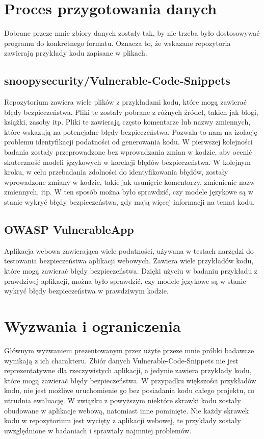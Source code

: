 \section{Proces przygotowania danych}
\label{sec:proces_przygotowania_danych}

Dobrane przeze mnie zbiory danych zostały tak, by nie trzeba było dostosowywać programu do konkretnego formatu. Oznacza to, że wskazane repozytoria zawierają przykłady kodu zapisane w plikach.
\subsection{snoopysecurity/Vulnerable-Code-Snippets} 
Repozytorium zawiera wiele plików z przykładami kodu, które mogą zawierać błędy bezpieczeństwa. Pliki te zostały pobrane z różnych źródeł, takich jak blogi, książki, zasoby itp. Pliki te zawierają często komentarze lub nazwy zmiennych, które wskazują na potencjalne błędy bezpieczeństwa. Pozwala to nam na izolację problemu identyfikacji podatności od generowania kodu. W pierwszej kolejności badania zostały przeprowadzone bez wprowadzania zmian w kodzie, aby ocenić skuteczność modeli językowych w korekcji błędów bezpieczeństwa. W kolejnym kroku, w celu przebadania zdolności do identyfikowania błędów, zostały wprowadzone zmiany w kodzie, takie jak usunięcie komentarzy, zmienienie nazw zmiennych, itp. W ten sposób można było sprawdzić, czy modele językowe są w stanie wykryć błędy bezpieczeństwa, gdy mają więcej informacji na temat kodu.

\subsection{OWASP VulnerableApp}
Aplikacja webowa zawierająca wiele podatności, używana w testach narzędzi do testowania bezpieczeństwa aplikacji webowych. Zawiera wiele przykładów kodu, które mogą zawierać błędy bezpieczeństwa. Dzięki użyciu w badaniu przykładu z prawdziwej aplikacji, można było sprawdzić, czy modele językowe są w stanie wykryć błędy bezpieczeństwa w prawdziwym kodzie.

\section{Wyzwania i ograniczenia}
\label{sec:wyzwania_i_ograniczenia}

Głównym wyzwaniem prezentowanym przez użyte przeze mnie próbki badawcze wynikają z ich charakteru. Zbiór danych Vulnerable-Code-Snippets nie jest reprezentatywne dla rzeczywistych aplikacji, a jedynie zawiera przykłady kodu, które mogą zawierać błędy bezpieczeństwa. W przypadku większości przykładów kodu, nie jest możliwe uruchomienie go bez posiadania kodu całego projektu, co utrudnia ewaluację. W związku z powyższym niektóre skrawki kodu zostały obudowane w aplikacje webową, natomiast inne pominięte. Nie każdy skrawek kodu w repozytorium jest wycięty z aplikacji webowej, te przykłady zostały uwzględnione w badaniach i sprawiały najmniej problemów. 

